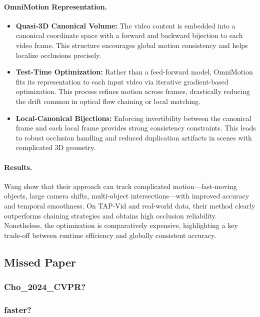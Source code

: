 \documentclass[11pt]{article}
\begin{document}
\paragraph{OmniMotion Representation.}
\begin{itemize}
\item \textbf{Quasi-3D Canonical Volume:} The video content is embedded into a canonical coordinate space with a forward and backward bijection to each video frame. This structure encourages global motion consistency and helps localize occlusions precisely.
\item \textbf{Test-Time Optimization:} Rather than a feed-forward model, OmniMotion fits its representation to each input video via iterative gradient-based optimization. This process refines motion across frames, drastically reducing the drift common in optical flow chaining or local matching.
\item \textbf{Local-Canonical Bijections:} Enforcing invertibility between the canonical frame and each local frame provides strong consistency constraints. This leads to robust occlusion handling and reduced duplication artifacts in scenes with complicated 3D geometry.
\end{itemize}

\paragraph{Results.}
Wang \etal show that their approach can track complicated motion—fast-moving objects, large camera shifts, multi-object intersections—with improved accuracy and temporal smoothness. On TAP-Vid and real-world data, their method clearly outperforms chaining strategies and obtains high occlusion reliability. Nonetheless, the optimization is comparatively expensive, highlighting a key trade-off between runtime efficiency and globally consistent accuracy.



\subsection{Missed Paper}

\subsubsection{Cho\_2024\_CVPR?}

\subsubsection{faster?}
\end{document}
